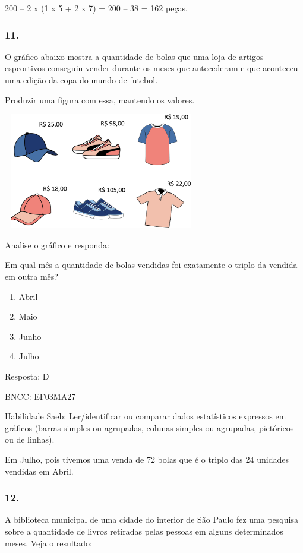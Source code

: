 200 -- 2 x (1 x 5 + 2 x 7) = 200 -- 38 = 162 peças.

\subsubsection{11.}\label{section-151}

O gráfico abaixo mostra a quantidade de bolas que uma loja de artigos
espeortivos conseguiu vender durante os meses que antecederam e que
aconteceu uma edição da copa do mundo de futebol.

Produzir uma figura com essa, mantendo os valores.

\includegraphics[width=3.36538in,height=2.00040in]{media/image120.png}

Analise o gráfico e responda:

Em qual mês a quantidade de bolas vendidas foi exatamente o triplo da
vendida em outra mês?

\begin{enumerate}
\def\labelenumi{\alph{enumi})}
\item
  Abril
\item
  Maio
\item
  Junho
\item
  Julho
\end{enumerate}

Resposta: D

BNCC: EF03MA27

Habilidade Saeb: Ler/identificar ou comparar dados estatísticos
expressos em gráficos (barras simples ou agrupadas, colunas simples ou
agrupadas, pictóricos ou de linhas).

Em Julho, pois tivemos uma venda de 72 bolas que é o triplo das 24
unidades vendidas em Abril.

\subsubsection{12.}\label{section-152}

A biblioteca municipal de uma cidade do interior de São Paulo fez uma
pesquisa sobre a quantidade de livros retiradas pelas pessoas em alguns
determinados meses. Veja o resultado:


